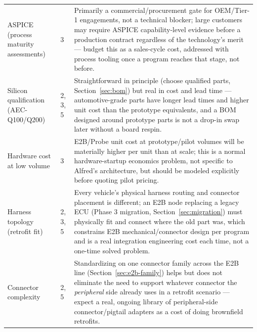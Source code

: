 \begin{center}
\begin{longtable}{@{}p{2.4cm} p{1.7cm} p{11.2cm}@{}}
ASPICE (process maturity assessments) & 3 & Primarily a commercial/procurement gate for OEM/Tier-1 engagements, not a technical blocker; large customers may require ASPICE capability-level evidence before a production contract regardless of the technology's merit --- budget this as a sales-cycle cost, addressed with process tooling once a program reaches that stage, not before. \\
Silicon qualification (AEC-Q100/Q200) & 2, 3, 5 & Straightforward in principle (choose qualified parts, Section~\ref{sec:bom}) but real in cost and lead time --- automotive-grade parts have longer lead times and higher unit cost than the prototype equivalents, and a BOM designed around prototype parts is not a drop-in swap later without a board respin. \\
Hardware cost at low volume & 3 & E2B/Probe unit cost at prototype/pilot volumes will be materially higher per unit than at scale; this is a normal hardware-startup economics problem, not specific to Alfred's architecture, but should be modeled explicitly before quoting pilot pricing. \\
Harness topology (retrofit fit) & 2, 3, 5 & Every vehicle's physical harness routing and connector placement is different; an E2B node replacing a legacy ECU (Phase 3 migration, Section~\ref{sec:migration}) must physically fit and connect where the old part was, which constrains E2B mechanical/connector design per program and is a real integration engineering cost each time, not a one-time solved problem. \\
Connector complexity & 2, 5 & Standardizing on one connector family across the E2B line (Section~\ref{sec:e2b-family}) helps but does not eliminate the need to support whatever connector the \emph{peripheral} side already uses in a retrofit scenario --- expect a real, ongoing library of peripheral-side connector/pigtail adapters as a cost of doing brownfield retrofits. \\
\bottomrule
\end{longtable}
\end{center}
